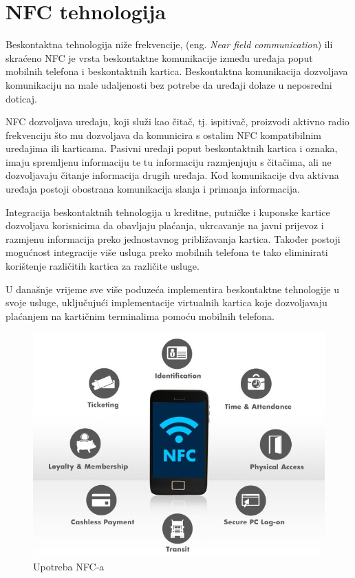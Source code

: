 \documentclass[times, utf8, zavrsni]{fer}
\begin{document}
\chapter{NFC tehnologija}
Beskontaktna tehnologija niže frekvencije, (eng. \textit{Near field communication}) ili skraćeno NFC je vrsta beskontaktne komunikacije između uređaja poput mobilnih telefona i beskontaktnih kartica. Beskontaktna komunikacija dozvoljava komunikaciju na male udaljenosti bez potrebe da uređaji dolaze u neposredni doticaj. \par
NFC dozvoljava uređaju, koji služi kao čitač, tj. ispitivač, proizvodi aktivno radio frekvenciju što mu dozvoljava da komunicira s ostalim NFC kompatibilnim uređajima ili karticama. Pasivni uređaji poput beskontaktnih kartica i oznaka, imaju spremljenu informaciju te tu informaciju razmjenjuju s čitačima, ali ne dozvoljavaju čitanje informacija drugih uređaja. Kod komunikacije dva aktivna uređaja postoji obostrana komunikacija slanja i primanja informacija.\par 
Integracija beskontaktnih tehnologija u kreditne, putničke i kuponske kartice dozvoljava korisnicima da obavljaju plaćanja, ukrcavanje na javni prijevoz i razmjenu informacija preko jednostavnog  približavanja kartica. Također postoji mogućnost integracije više usluga preko mobilnih telefona te tako eliminirati korištenje različitih kartica za različite usluge.\par 
U današnje vrijeme sve više poduzeća implementira beskontaktne tehnologije u svoje usluge, uključujući implementacije virtualnih kartica koje dozvoljavaju plaćanjem na kartičnim terminalima pomoću mobilnih telefona.
\citep{1}

\begin{figure}[h]
\includegraphics[scale=0.4]{nfcuse.jpeg}
\centering
\caption{Upotreba NFC-a \citep{2}}
\centering
\end{figure}
\end{document}
